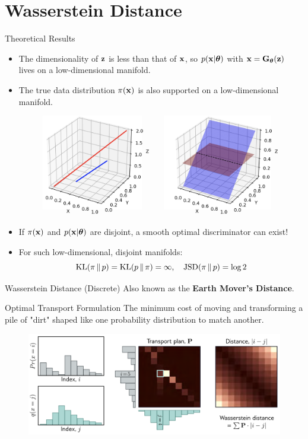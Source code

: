 \documentclass{beamer}
\begin{document}
\section{Wasserstein Distance}
\begin{frame}{Theoretical Results}
	\vspace{-0.3cm}
	\begin{itemize}
		\item The dimensionality of $\mathbf{z}$ is less than that of $\mathbf{x}$, so $p(\mathbf{x} | \boldsymbol{\theta})$ with $\mathbf{x} = \mathbf{G}_{\boldsymbol{\theta}}(\mathbf{z})$ lives on a low-dimensional manifold.
		\eqpause
		\item The true data distribution $\pi(\mathbf{x})$ is also supported on a low-dimensional manifold.
		\begin{figure}
			\centering
			\includegraphics[width=0.55\linewidth]{figs/low_dim_manifold}
		\end{figure}
		\eqpause
		\item If $\pi(\mathbf{x})$ and $p(\mathbf{x} | \boldsymbol{\theta})$ are disjoint, a smooth optimal discriminator can exist!
		\eqpause
		\item For such low-dimensional, disjoint manifolds:
		\vspace{-0.2cm}
		\[
			\mathrm{KL}(\pi\,\|\,p) = \mathrm{KL}(p\,\|\,\pi) = \infty, \quad \mathrm{JSD}(\pi\,\|\,p) = \log 2
		\]
	\end{itemize}
\end{frame}
\begin{frame}{Wasserstein Distance (Discrete)}
	Also known as the \textbf{Earth Mover's Distance}.
	\begin{block}{Optimal Transport Formulation}
		The minimum cost of moving and transforming a pile of "dirt" shaped like one probability distribution to match another.
	\end{block}
	\begin{figure}
		\centering
		\includegraphics[width=\linewidth]{figs/discrete_wasserstein}
	\end{figure}
\end{frame}
\end{document}
